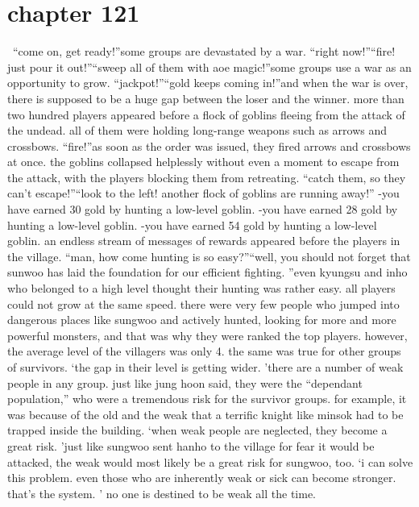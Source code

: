 \section{chapter 121}






 “come on, get ready!”some groups are devastated by a war.
“right now!”“fire! just pour it out!”“sweep all of them with aoe magic!”some groups use a war as an opportunity to grow.
“jackpot!”“gold keeps coming in!”and when the war is over, there is supposed to be a huge gap between the loser and the winner.
more than two hundred players appeared before a flock of goblins fleeing from the attack of the undead.
 all of them were holding long-range weapons such as arrows and crossbows.
“fire!”as soon as the order was issued, they fired arrows and crossbows at once.
 the goblins collapsed helplessly without even a moment to escape from the attack, with the players blocking them from retreating.
“catch them, so they can’t escape!”“look to the left! another flock of goblins are running away!”
-you have earned 30 gold by hunting a low-level goblin.
-you have earned 28 gold by hunting a low-level goblin.
-you have earned 54 gold by hunting a low-level goblin.
an endless stream of messages of rewards appeared before the players in the village.
“man, how come hunting is so easy?”“well, you should not forget that sunwoo has laid the foundation for our efficient fighting.
”even kyungsu and inho who belonged to a high level thought their hunting was rather easy.
all players could not grow at the same speed.
 there were very few people who jumped into dangerous places like sungwoo and actively hunted, looking for more and more powerful monsters, and that was why they were ranked the top players.
however, the average level of the villagers was only 4.
 the same was true for other groups of survivors.
‘the gap in their level is getting wider.
’there are a number of weak people in any group.
 just like jung hoon said, they were the “dependant population,” who were a tremendous risk for the survivor groups.
for example, it was because of the old and the weak that a terrific knight like minsok had to be trapped inside the building.
‘when weak people are neglected, they become a great risk.
’just like sungwoo sent hanho to the village for fear it would be attacked, the weak would most likely be a great risk for sungwoo, too.
‘i can solve this problem.
 even those who are inherently weak or sick can become stronger.
 that’s the system.
’
no one is destined to be weak all the time.
